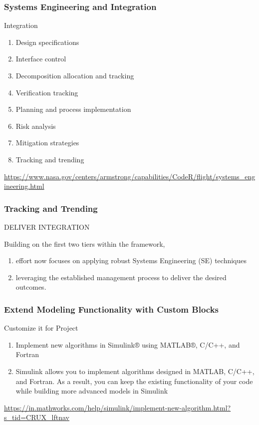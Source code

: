 \begin{frame}
\frametitle{Systems Engineering and Integration}
\begin{block}{Integration  }

\begin{enumerate}
    \item  Design specifications
    \item  Interface control
    \item Decomposition allocation and tracking
    \item  Verification tracking
    \item  Planning and process implementation
       \item  Risk analysis
       \item  Mitigation strategies
        \item  Tracking and trending
\end{enumerate}
\url{https://www.nasa.gov/centers/armstrong/capabilities/CodeR/flight/systems_engineering.html}

\end{block}
\end{frame}


\begin{frame}
\frametitle{Tracking and Trending}
\begin{block}{DELIVER INTEGRATION  }

 Building on the first two tiers within the framework,
 
\begin{enumerate}
    \item   effort now focuses on applying robust Systems Engineering (SE) techniques 
    \item   leveraging the established management process to deliver the desired outcomes.
 \end{enumerate}

\end{block}
\end{frame}

\begin{frame}
\frametitle{Extend Modeling Functionality with Custom Blocks}
\begin{block}{Customize it for Project  }


 
\begin{enumerate}
    \item   Implement new algorithms in Simulink® using MATLAB®, C/C++, and Fortran 
    \item   Simulink allows you to implement algorithms designed in MATLAB, C/C++, and Fortran. As a result, you can keep the existing functionality of your code while building more advanced models in Simulink
    
 \end{enumerate}

 \url{https://in.mathworks.com/help/simulink/implement-new-algorithm.html?s_tid=CRUX_lftnav}

\end{block}
\end{frame}

